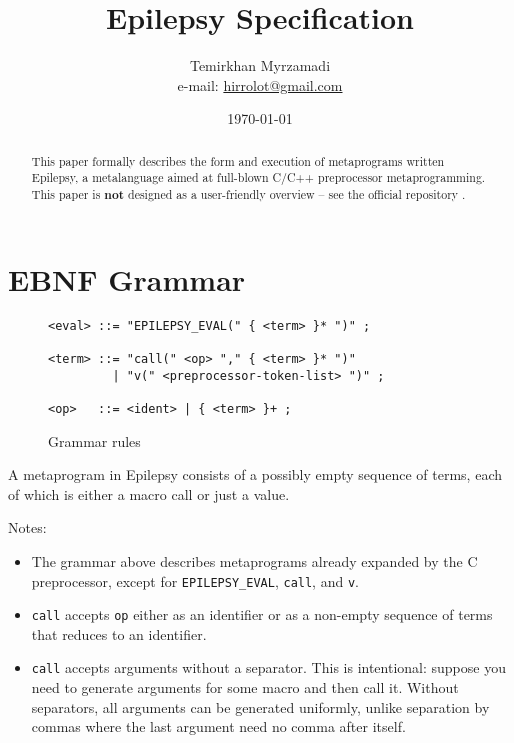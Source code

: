 \documentclass[12pt]{article}
\theoremstyle{break}
\begin{document}
\title{Epilepsy Specification}
\date{\today}
\author{Temirkhan Myrzamadi \\ e-mail: \href{mailto:hirrolot@gmail.com}{hirrolot@gmail.com}}
\maketitle

\begin{abstract}
This paper formally describes the form and execution of metaprograms written
Epilepsy, a metalanguage aimed at full-blown C/C++ preprocessor metaprogramming. This paper
is \textbf{not} designed as a user-friendly overview -- see the official repository
\cite{Epilepsy}.
\end{abstract}

\tableofcontents

\newpage

\section{EBNF Grammar}

\begin{figure}[H]
    \caption{Grammar rules}

\begin{verbatim}
<eval> ::= "EPILEPSY_EVAL(" { <term> }* ")" ;

<term> ::= "call(" <op> "," { <term> }* ")"
         | "v(" <preprocessor-token-list> ")" ;

<op>   ::= <ident> | { <term> }+ ;
\end{verbatim}

\end{figure}

A metaprogram in Epilepsy consists of a possibly empty sequence of terms, each of which
is either a macro call or just a value.

Notes:

\begin{itemize}
    \item The grammar above describes metaprograms already expanded by the C preprocessor,
    except for \texttt{EPILEPSY\_EVAL}, \texttt{call}, and \texttt{v}.
    \item \texttt{call} accepts \texttt{op} either as an identifier or as a non-empty
    sequence of terms that reduces to an identifier.
    \item \texttt{call} accepts arguments without a separator. This is intentional: suppose
    you need to generate arguments for some macro and then call it. Without separators, all
    arguments can be generated uniformly, unlike separation by commas where the last argument
    need no comma after itself.
\end{itemize}
\end{document}
